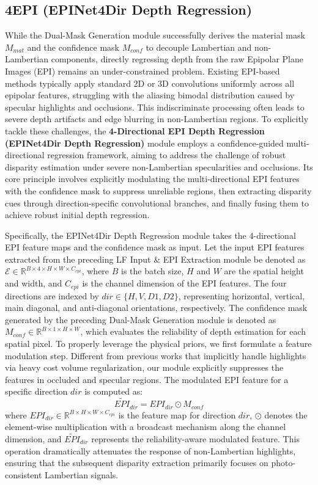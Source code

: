 \documentclass[lettersize,journal]{IEEEtran}
\begin{document}
\subsection{4EPI (EPINet4Dir Depth Regression)}

While the Dual-Mask Generation module successfully derives the material mask $M_{mat}$ and the confidence mask $M_{conf}$ to decouple Lambertian and non-Lambertian components, directly regressing depth from the raw Epipolar Plane Images (EPI) remains an under-constrained problem. Existing EPI-based methods typically apply standard 2D or 3D convolutions uniformly across all epipolar features, struggling with the aliasing bimodal distribution caused by specular highlights and occlusions. This indiscriminate processing often leads to severe depth artifacts and edge blurring in non-Lambertian regions. To explicitly tackle these challenges, the \textbf{4-Directional EPI Depth Regression (EPINet4Dir Depth Regression)} module employs a confidence-guided multi-directional regression framework, aiming to address the challenge of robust disparity estimation under severe non-Lambertian specularities and occlusions. Its core principle involves explicitly modulating the multi-directional EPI features with the confidence mask to suppress unreliable regions, then extracting disparity cues through direction-specific convolutional branches, and finally fusing them to achieve robust initial depth regression.

Specifically, the EPINet4Dir Depth Regression module takes the 4-directional EPI feature maps and the confidence mask as input. Let the input EPI features extracted from the preceding LF Input \& EPI Extraction module be denoted as $\mathcal{E} \in \mathbb{R}^{B \times 4 \times H \times W \times C_{epi}}$, where $B$ is the batch size, $H$ and $W$ are the spatial height and width, and $C_{epi}$ is the channel dimension of the EPI features. The four directions are indexed by $dir \in \{H, V, D1, D2\}$, representing horizontal, vertical, main diagonal, and anti-diagonal orientations, respectively. The confidence mask generated by the preceding Dual-Mask Generation module is denoted as $M_{conf} \in \mathbb{R}^{B \times 1 \times H \times W}$, which evaluates the reliability of depth estimation for each spatial pixel. To properly leverage the physical priors, we first formulate a feature modulation step. Different from previous works that implicitly handle highlights via heavy cost volume regularization, our module explicitly suppresses the features in occluded and specular regions. The modulated EPI feature for a specific direction $dir$ is computed as:
\begin{equation}
\label{eq:eq15}
\widetilde{EPI}_{dir} = EPI_{dir} \odot M_{conf}
\end{equation}
where $EPI_{dir} \in \mathbb{R}^{B \times H \times W \times C_{epi}}$ is the feature map for direction $dir$, $\odot$ denotes the element-wise multiplication with a broadcast mechanism along the channel dimension, and $\widetilde{EPI}_{dir}$ represents the reliability-aware modulated feature. This operation dramatically attenuates the response of non-Lambertian highlights, ensuring that the subsequent disparity extraction primarily focuses on photo-consistent Lambertian signals.
\end{document}

